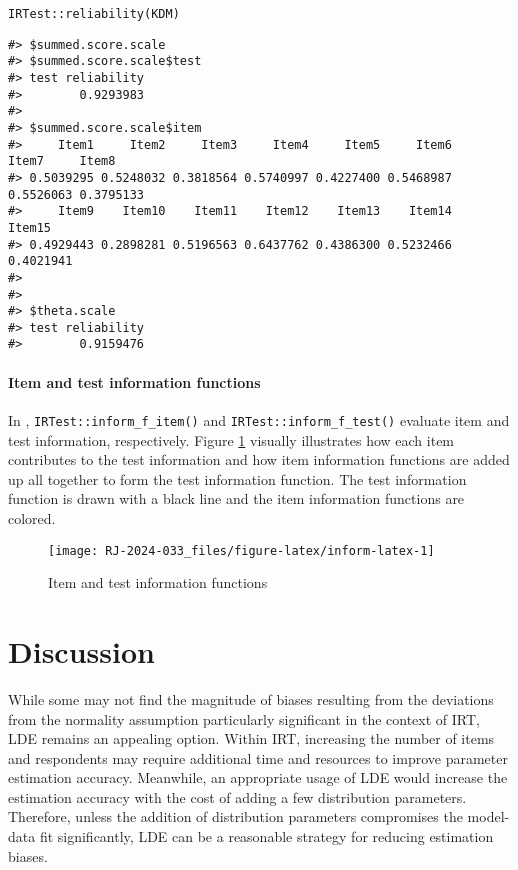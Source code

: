\begin{verbatim}
IRTest::reliability(KDM)
\end{verbatim}

\begin{verbatim}
#> $summed.score.scale
#> $summed.score.scale$test
#> test reliability 
#>        0.9293983 
#> 
#> $summed.score.scale$item
#>     Item1     Item2     Item3     Item4     Item5     Item6     Item7     Item8 
#> 0.5039295 0.5248032 0.3818564 0.5740997 0.4227400 0.5468987 0.5526063 0.3795133 
#>     Item9    Item10    Item11    Item12    Item13    Item14    Item15 
#> 0.4929443 0.2898281 0.5196563 0.6437762 0.4386300 0.5232466 0.4021941 
#> 
#> 
#> $theta.scale
#> test reliability 
#>        0.9159476
\end{verbatim}

\hypertarget{item-and-test-information-functions}{%
\paragraph{Item and test information functions}\label{item-and-test-information-functions}}

In , \texttt{IRTest::inform\_f\_item()} and \texttt{IRTest::inform\_f\_test()} evaluate
item and test information, respectively. Figure
\ref{fig:inform-latex}
visually illustrates how each item contributes to the test information
and how item information functions are added up all together to form the test
information function. The test information function is drawn with a black
line and the item information functions are colored.

\begin{figure}[H]

{\centering \texttt{[image: RJ-2024-033\_files/figure-latex/inform-latex-1]} 

}

\caption{Item and test information functions}\label{fig:inform-latex}
\end{figure}

\hypertarget{discussion}{%
\section{Discussion}\label{discussion}}

While some may not find the magnitude of biases resulting from the deviations
from the normality assumption particularly significant in the context of
IRT, LDE remains an appealing option. Within IRT, increasing the number of
items and respondents may require additional time and resources to improve parameter estimation accuracy.
Meanwhile, an appropriate usage of LDE would increase the estimation
accuracy with the cost of adding a few distribution parameters. Therefore,
unless the addition of distribution parameters compromises the model-data fit significantly,
LDE can be a reasonable strategy for reducing estimation biases.

